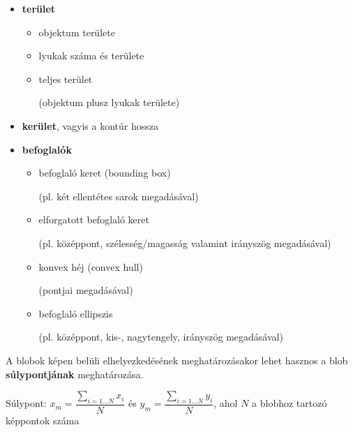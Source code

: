 \begin{itemize}
  \item \textbf{terület}
    \begin{itemize}
      \item objektum területe
      \item lyukak száma és területe
      \item teljes terület \\ \begin{small}(objektum plusz lyukak területe)\end{small}
    \end{itemize}
  \item \textbf{kerület}, vagyis a kontúr hossza
  \item \textbf{befoglalók}
    \begin{itemize}
      \item befoglaló keret (bounding box) \\ \begin{small}(pl. két ellentétes sarok megadásával)\end{small}
      \item elforgatott befoglaló keret \\ \begin{small}(pl. középpont, szélesség/magasság valamint irányszög megadásával)\end{small}
      \item konvex héj (convex hull) \\ \begin{small}(pontjai megadásával)\end{small}
      \item befoglaló ellipszis \\ \begin{small}(pl. középpont, kis-, nagytengely, irányszög megadásával)\end{small}
    \end{itemize}
\end{itemize}

\bigskip

A blobok képen belüli elhelyezkedésének meghatározásakor lehet hasznos a blob \textbf{súlypontjának} meghatározása.

\begin{definition}{Súlypont:}
$x_m = \dfrac{\sum_{i=1 \dots N} x_i}{N}$ és $y_m = \dfrac{\sum_{i=1 \dots N} y_i}{N}$, ahol $N$ a blobhoz tartozó képpontok száma
\end{definition}

\bigskip

